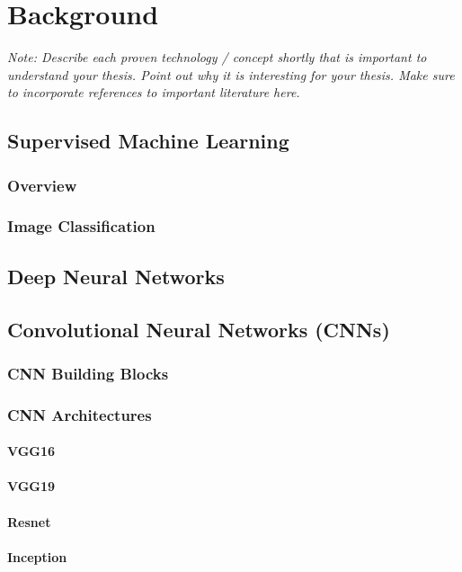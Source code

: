 \documentclass[a4paper,12pt,twoside]{report}
\begin{document}

\chapter{Background}

\textit{Note: Describe each proven technology / concept shortly that is important to understand your thesis. Point out why it is interesting for your thesis. Make sure to incorporate references to important literature here.}

\section{Supervised Machine Learning}
\subsection{Overview}
\subsection{Image Classification}

\section{Deep Neural Networks}

\section{Convolutional Neural Networks (CNNs)}
\subsection{CNN Building Blocks}
\subsection{CNN Architectures}
\subsubsection{VGG16}
\subsubsection{VGG19}
\subsubsection{Resnet}
\subsubsection{Inception}
\end{document}

